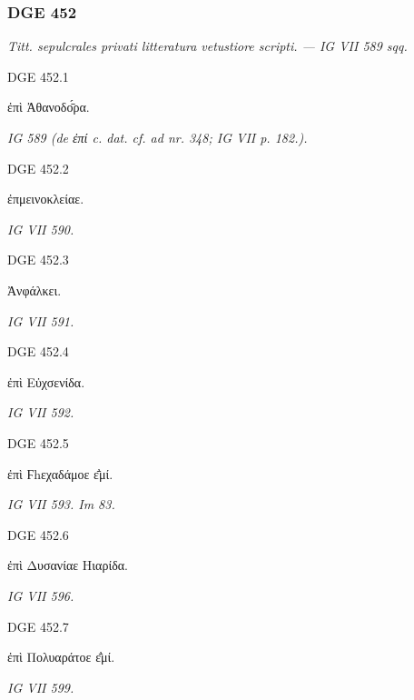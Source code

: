 \hrulefill

\subsubsection{DGE 452}
\textit{Titt. sepulcrales privati litteratura vetustiore scripti. — IG VII 589 sqq.}

\begin{versi}{DGE 452.1}
\begin{greek}
ἐπὶ Ἀθανοδο̄́ρα.
\end{greek}
\end{versi}
\textit{IG 589 (de \textgreek{ἐπί} c. dat. cf. ad nr. 348; IG VII p. 182.).}

\begin{versi}{DGE 452.2}
\begin{greek}
ἐπμεινοκλείαε.
\end{greek}
\end{versi}
\textit{IG VII 590.}

\begin{versi}{DGE 452.3}
\begin{greek}
 Ἀνφάλκει.
\end{greek}
\end{versi}
\textit{IG VII 591.}

\begin{versi}{DGE 452.4}
\begin{greek}
ἐπὶ Εὐχσενίδα.
\end{greek}
\end{versi}
\textit{IG VII 592.}

\begin{versi}{DGE 452.5}
\begin{greek}
ἐπὶ Ϝhεχαδάμοε ε̄̓μί.
\end{greek}
\end{versi}
\textit{IG VII 593. Im 83.}

\begin{versi}{DGE 452.6}
\begin{greek}
ἐπὶ Δυσανίαε Hιαρίδα.
\end{greek}
\end{versi}
\textit{IG VII 596.}

\begin{versi}{DGE 452.7}
\begin{greek}
ἐπὶ Πολυαράτοε ε̄̓μί.
\end{greek}
\end{versi}
\textit{IG VII 599.}

